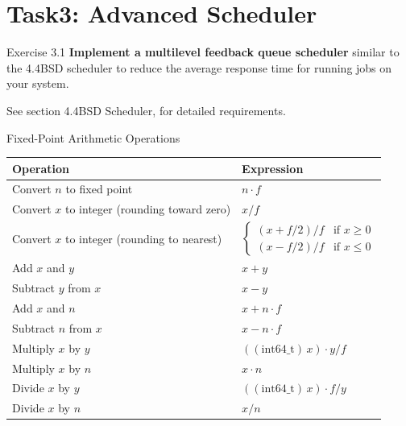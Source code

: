 \documentclass{beamer}
\begin{document}
\section{Task3: Advanced Scheduler}
\begin{frame}[fragile]{Exercise 3.1}
    \textbf{Implement a multilevel feedback queue scheduler} similar to the 4.4BSD scheduler to reduce the average response time for running jobs on your system.

See section 4.4BSD Scheduler, for detailed requirements.
\end{frame}
\begin{frame}{Fixed-Point Arithmetic Operations}
\small
\begin{table}
\begin{tabular}{ll}
\toprule
\textbf{Operation} & \textbf{Expression} \\
\midrule
Convert $n$ to fixed point & $n \cdot f$ \\
Convert $x$ to integer (rounding toward zero) & $x / f$ \\
Convert $x$ to integer (rounding to nearest) & 
    $\begin{cases} 
    (x + f / 2) / f & \text{if } x \geq 0 \\ 
    (x - f / 2) / f & \text{if } x \leq 0 
    \end{cases}$ \\
Add $x$ and $y$ & $x + y$ \\
Subtract $y$ from $x$ & $x - y$ \\
Add $x$ and $n$ & $x + n \cdot f$ \\
Subtract $n$ from $x$ & $x - n \cdot f$ \\
Multiply $x$ by $y$ & $((\text{int64\_t}) \, x) \cdot y / f$ \\
Multiply $x$ by $n$ & $x \cdot n$ \\
Divide $x$ by $y$ & $((\text{int64\_t}) \, x) \cdot f / y$ \\
Divide $x$ by $n$ & $x / n$ \\
\bottomrule
\end{tabular}
\end{table}
\end{frame}
\end{document}
